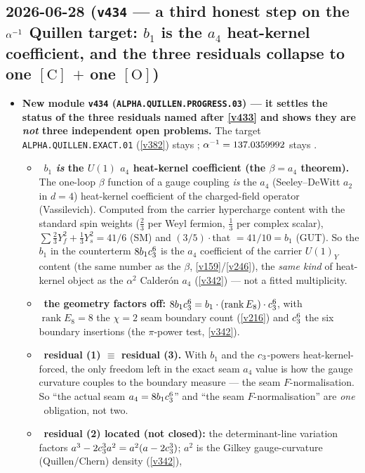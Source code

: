 \subsection*{2026-06-28 (\texttt{v434} --- a third honest step on the $\alpha^{-1}$ Quillen target: $b_1$ is the $a_4$ heat-kernel coefficient, and the three residuals collapse to one $\mathrm{[C]}$ $+$ one $\mathrm{[O]}$)}
\begin{itemize}
\item \textbf{New module \texttt{v434} (\texttt{ALPHA.QUILLEN.PROGRESS.03}) --- it settles the status of the
three residuals named after \vref{v433} and shows they are \emph{not} three independent open problems.} The
target \texttt{ALPHA.QUILLEN.EXACT.01} (\vref{v382}) stays \mO; $\alpha^{-1}=137.0359992$ stays \mE.
\begin{itemize}
\item \mE\ \textbf{$b_1$ \emph{is} the $U(1)$ $a_4$ heat-kernel coefficient (the $\beta=a_4$ theorem).} The
one-loop $\beta$ function of a gauge coupling \emph{is} the $a_4$ (Seeley--DeWitt $a_2$ in $d{=}4$) heat-kernel
coefficient of the charged-field operator (Vassilevich). Computed from the carrier hypercharge content with the
standard spin weights ($\tfrac23$ per Weyl fermion, $\tfrac13$ per complex scalar),
$\sum\tfrac23 Y_f^2+\tfrac13 Y_s^2 = 41/6$ (SM) and $(3/5)\cdot{}$that $=41/10=b_1$ (GUT). So the $b_1$ in the
counterterm $8b_1c_3^6$ is the $a_4$ coefficient of the carrier $U(1)_Y$ content (the same number as the
$\beta$, \vref{v159}/\vref{v246}), the \emph{same kind} of heat-kernel object as the $\alpha^2$ Calder\'on $a_4$
(\vref{v342}) --- not a fitted multiplicity.
\item \mE\ \textbf{the geometry factors off:} $8b_1c_3^6=b_1\cdot(\operatorname{rank}E_8)\cdot c_3^6$, with
$\operatorname{rank}E_8=8$ the $\chi{=}2$ seam boundary count (\vref{v216}) and $c_3^6$ the six boundary
insertions (the $\pi$-power test, \vref{v342}).
\item \mC\ \textbf{residual (1) $\equiv$ residual (3).} With $b_1$ and the $c_3$-powers heat-kernel-forced,
the only freedom left in the exact seam $a_4$ value is how the gauge curvature couples to the boundary measure ---
the seam $F$-normalisation. So ``the actual seam $a_4=8b_1c_3^6$'' and ``the seam $F$-normalisation'' are
\emph{one} \mC\ obligation, not two.
\item \mE\ \textbf{residual (2) located (not closed):} the determinant-line variation factors
$a^3-2c_3^3 a^2 = a^2(a-2c_3^3)$; $a^2$ is the Gilkey gauge-curvature (Quillen/Chern) density (\vref{v342}),

\end{itemize}
\end{itemize}
